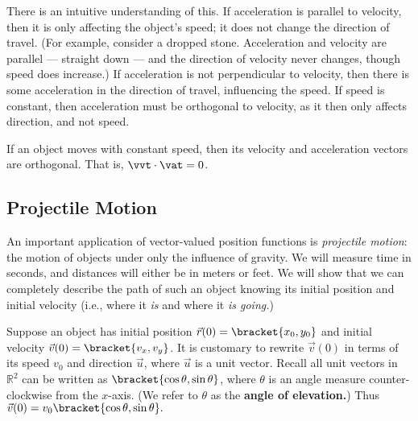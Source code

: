 There is an intuitive understanding of this. If acceleration is parallel to velocity, then it is only affecting the object's speed; it does not change the direction of travel. (For example, consider a dropped stone. Acceleration and velocity are parallel --- straight down --- and the direction of velocity never changes, though speed does increase.) If acceleration is not perpendicular to velocity, then there is some acceleration in the direction of travel, influencing the speed. If speed is constant, then acceleration must be orthogonal to velocity, as it then only affects direction, and not speed.

\begin{keyidea}\label{idea:constant_speed}
If an object moves with constant speed, then its velocity and acceleration vectors are orthogonal. That is, $\vvt\cdot\vat=0$.
\end{keyidea}


\subsection{Projectile Motion}

An important application of vector-valued position functions is \emph{projectile motion}: the motion of objects under only the influence of gravity. We will measure time in seconds, and distances will either be in meters or feet. We will show that we can completely describe the path of such an object knowing its initial position and initial velocity (i.e., where it \emph{is} and where it \emph{is going.})

Suppose an object has initial position $\vec r(0) =\bracket{x_0,y_0}$ and initial velocity $\vec v(0) =\bracket{v_x,v_y}$. It is customary to rewrite $\vec v(0)$ in terms of its speed $v_0$ and direction $\vec u$, where $\vec u$ is a unit vector. Recall all unit vectors in $\mathbb{R}^2$ can be written as $\bracket{\cos \theta,\sin \theta}$, where $\theta$ is an angle measure counter-clockwise from the $x$-axis. (We refer to $\theta$ as the \textbf{angle of elevation.}) Thus $\vec v(0) = v_0\bracket{\cos \theta,\sin \theta}.$ 


